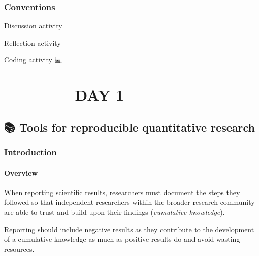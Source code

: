 \documentclass[
  letterpaper,
  DIV=11,
  numbers=noendperiod,
  oneside]{scrreprt}
\begin{document}
\hypertarget{conventions}{%
\section{Conventions}\label{conventions}}

Discussion activity {💬}

Reflection activity {💭}

Coding activity {💻}

\part{------------ DAY 1 ------------}

\hypertarget{tools-for-reproducible-quantitative-research}{%
\chapter{\texorpdfstring{{📚} Tools for reproducible quantitative
research}{📚 Tools for reproducible quantitative research}}\label{tools-for-reproducible-quantitative-research}}

\hypertarget{introduction-2}{%
\section{Introduction}\label{introduction-2}}

\hypertarget{overview}{%
\subsection{Overview}\label{overview}}

When reporting scientific results, researchers must document the steps
they followed so that independent researchers within the broader
research community are able to trust and build upon their findings
(\emph{cumulative knowledge}).

\begin{tcolorbox}[enhanced jigsaw, coltitle=black, opacityback=0, title=\textcolor{quarto-callout-important-color}{\faExclamation}\hspace{0.5em}{Important}, toprule=.15mm, bottomtitle=1mm, colbacktitle=quarto-callout-important-color!10!white, colframe=quarto-callout-important-color-frame, left=2mm, opacitybacktitle=0.6, bottomrule=.15mm, arc=.35mm, toptitle=1mm, colback=white, titlerule=0mm, breakable, leftrule=.75mm, rightrule=.15mm]

Reporting should include negative results as they contribute to the
development of a cumulative knowledge as much as positive results do and
avoid wasting resources.

\end{tcolorbox}
\end{document}

